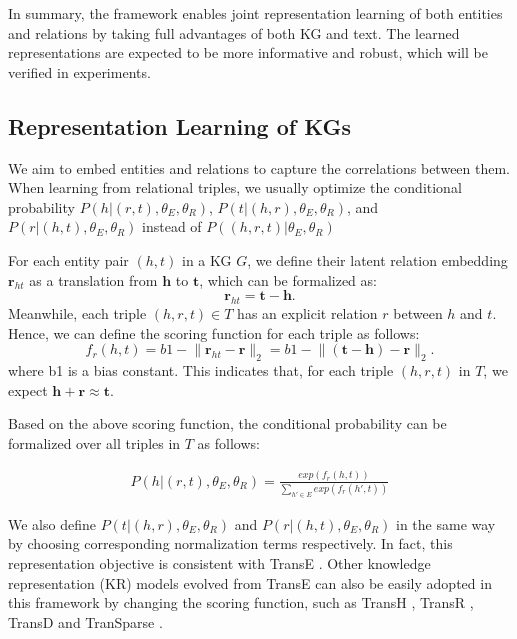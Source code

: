 \documentclass[11pt,a4paper]{article}
\begin{document}
In summary, the framework enables joint representation learning of both entities and relations by taking full advantages of both KG and text. The learned representations are expected to be more informative and robust, which will be verified in experiments.



\subsection{Representation Learning of KGs}
\label{sec:kg}

We aim to embed entities and relations to capture the correlations between them. When learning from relational triples, we usually optimize the conditional probability $P(h|(r, t),{\theta_E, \theta_R})$, $P(t|(h, r),{\theta_E, \theta_R})$, and $P(r|(h, t),{\theta_E, \theta_R})$ instead of $P((h, r, t)|{\theta_E, \theta_R})$

For each entity pair $(h, t)$ in a KG $G$, we define their latent relation embedding $\mathbf{r}_{ht}$ as a translation from $\mathbf{h}$ to $\mathbf{t}$, which can be formalized as:
\begin{equation}
\textbf{r}_{ht} = \textbf{t} - \textbf{h}.
\end{equation}
Meanwhile, each triple $(h, r, t) \in T$ has an explicit relation $r$ between $h$ and $t$. Hence, we can define the scoring function for each triple as follows:
\begin{equation}
f_r(h, t) = b1 - \lVert \textbf{r}_{ht} - \textbf{r} \rVert_2 = b1 - \lVert (\textbf{t} - \textbf{h}) - \textbf{r}  \rVert_2.
\end{equation}
where b1 is a bias constant. This indicates that, for each triple $(h, r, t)$ in $T$, we expect $\textbf{h} + \textbf{r} \approx \textbf{t}$.

Based on the above scoring function, the conditional probability can be formalized over all triples in $T$ as follows:

\begin{align}
P(h|(r, t),{\theta_E, \theta_R}) = \frac{exp(f_r(h, t))}{\sum_{h' \in E} exp(f_r(h', t))}
\end{align}

We also define $P(t|(h, r), {\theta_E, \theta_R})$ and $P(r|(h, t),{\theta_E, \theta_R})$ in the same way by choosing corresponding normalization terms respectively. In fact, this representation objective is consistent with TransE \cite{bordes2013translating}. Other knowledge representation (KR) models evolved from TransE can also be easily adopted in this framework by changing the scoring function, such as TransH \cite{wang2014transh}, TransR \cite{lin2015learning}, TransD \cite{ji2015knowledge} and TranSparse \cite{ji2016knowledge}. 
\end{document}
